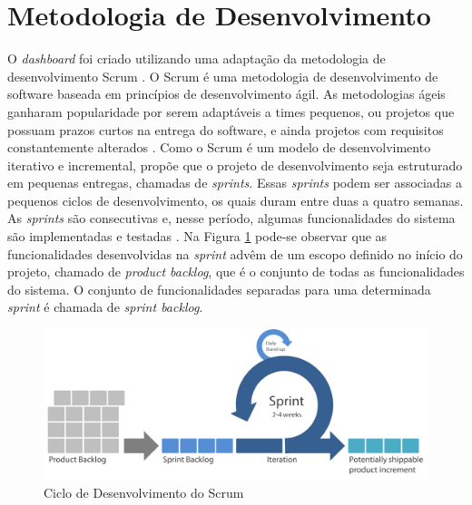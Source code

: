 \section{Metodologia de Desenvolvimento}
\label{met_desenvolvimento}
O \textit{dashboard} foi criado utilizando uma adaptação da metodologia de desenvolvimento Scrum \cite{pagotto_scrum_2016}. O Scrum é uma metodologia de desenvolvimento de software baseada em princípios de desenvolvimento ágil. As metodologias ágeis ganharam popularidade por serem adaptáveis a 	times pequenos, ou projetos que possuam prazos curtos na entrega do software, e ainda projetos com requisitos constantemente alterados \cite{lopez-martinez_problems_2016}. Como o Scrum é um modelo de desenvolvimento iterativo e incremental, propõe que o projeto de desenvolvimento seja estruturado em pequenas entregas, chamadas de \textit{sprints}. Essas \textit{sprints} podem ser associadas a pequenos ciclos de desenvolvimento, os quais duram entre duas a quatro semanas. As \textit{sprints} são consecutivas e, nesse período, algumas funcionalidades do sistema são implementadas e testadas \cite{pagotto_scrum_2016}. Na Figura \ref{img:scrum} pode-se observar que as funcionalidades desenvolvidas na \textit{sprint} advêm de um escopo definido no início do projeto,  chamado de \textit{product backlog}, que é o conjunto de todas as funcionalidades do sistema. O conjunto de funcionalidades separadas para uma determinada \textit{sprint} é chamada de \textit{sprint backlog}\cite{sabbagh_scrum:_2014}.
\graphicspath{{figuras/}}
\begin{figure}[H]
\centering
\includegraphics[scale=0.40]{scrum}
\caption{Ciclo de Desenvolvimento do Scrum}
\label{img:scrum}
\end{figure}

